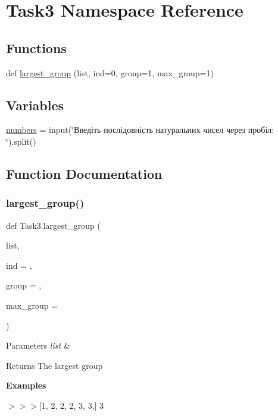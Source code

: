 \hypertarget{namespace_task3}{}\section{Task3 Namespace Reference}
\label{namespace_task3}
\subsection*{Functions}
\begin{DoxyCompactItemize}
\item 
def \hyperlink{namespace_task3_a5e9305edf588069d3b9efdbc668b116d}{largest\+\_\+group} (list, ind=0, group=1, max\+\_\+group=1)
\end{DoxyCompactItemize}
\subsection*{Variables}
\begin{DoxyCompactItemize}
\item 
\hyperlink{namespace_task3_a42c2f8d5fca89733308e3c4d6b7eba36}{numbers} = input(\char`\"{}Введіть послідовність натуральних чисел через пробіл\+: \char`\"{}).split()
\end{DoxyCompactItemize}


\subsection{Function Documentation}
\mbox{\label{namespace_task3_a5e9305edf588069d3b9efdbc668b116d}} 
\subsubsection{\texorpdfstring{largest\+\_\+group()}{largest\_group()}}
{\footnotesize\ttfamily def Task3.\+largest\+\_\+group (\begin{DoxyParamCaption}\item[{}]{list,  }\item[{}]{ind = {},  }\item[{}]{group = {},  }\item[{}]{max\+\_\+group = {} }\end{DoxyParamCaption})}


\begin{DoxyParams}{Parameters}
{\em list} & \\
\hline
\end{DoxyParams}
\begin{DoxyReturn}{Returns}
The largest group
\end{DoxyReturn}
{\bfseries Examples} 
\begin{DoxyCode}
\end{DoxyCode}
 $>$$>$$>$\mbox{[}1, 2, 2, 2, 3, 3,\mbox{]} 3

